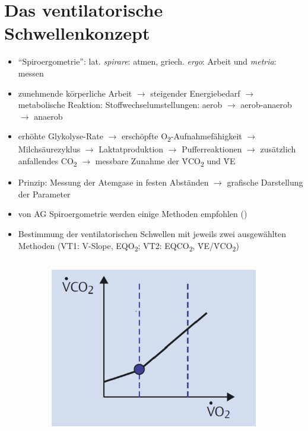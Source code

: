 \documentclass[colorBG,slideColor,8pt]{beamer}
\newcommand{\eqotwo}{EQO\textsubscript{2}}
\newcommand{\eqcotwo}{EQCO\textsubscript{2}}
\newcommand{\vcotwo}{\.{V}CO\textsubscript{2}}
\newcommand{\ve}{\.{V}E}
\begin{document}

\section{Das ventilatorische Schwellenkonzept}

\begin{frame}
\begin{itemize}
	\item "`Spiroergometrie"': lat. \textsl{spirare}: atmen, griech. \textsl{ergo}: Arbeit und \textsl{metria}: messen
	\item zunehmende körperliche Arbeit $\rightarrow$ steigender Energiebedarf $\rightarrow$ metabolische Reaktion: Stoffwechselumstellungen: aerob $\rightarrow$ aerob-anaerob $\rightarrow$ anaerob
	\item erhöhte Glykolyse-Rate $\rightarrow$ erschöpfte O\textsubscript{2}-Aufnahmefähigkeit $\rightarrow$ Milchsäurezyklus $\rightarrow$ Laktatproduktion $\rightarrow$ Pufferreaktionen $\rightarrow$ zusätzlich anfallendes CO\textsubscript{2} $\rightarrow$ messbare Zunahme der \vcotwo{} und \ve
	\item Prinzip: Messung der Atemgase in festen Abständen $\rightarrow$ grafische Darstellung der Parameter
	\item von AG Spiroergometrie werden einige Methoden empfohlen (\cite{Westhoff.2012})
	\item Bestimmung der ventilatorischen Schwellen mit jeweils zwei ausgewählten Methoden (VT1: V-Slope, \eqotwo; VT2: \eqcotwo, \ve/\vcotwo)
\end{itemize}
\begin{columns}
\begin{column}{\linewidth}
\begin{figure}[H]
	\begin{subfigure}[c]{0.2\linewidth}
		\centering
		\includegraphics[width=0.8\linewidth]{Bilder/vslope.png}

\end{subfigure}
\end{figure}
\end{column}
\end{columns}
\end{frame}
\end{document}
